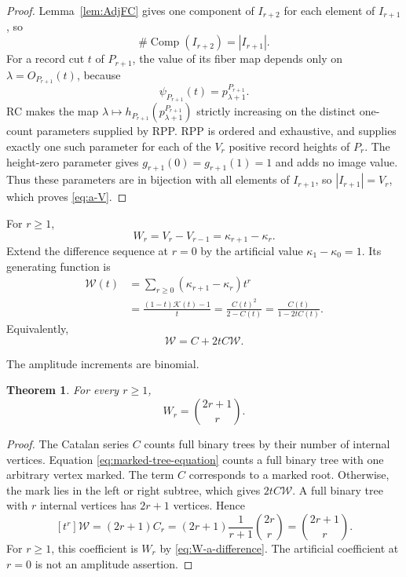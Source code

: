 \documentclass[11pt]{article}
\newtheorem{theorem}{Theorem}[section]
\theoremstyle{definition}
\theoremstyle{remark}
\DeclareMathOperator{\Comp}{Comp}
\begin{document}
\begin{proof}
Lemma~\ref{lem:AdjFC} gives one component of \(I_{r+2}\) for each element of
\(I_{r+1}\), so
\[
 \#\Comp(I_{r+2})=|I_{r+1}|.
\]
For a record cut \(t\) of \(P_{r+1}\), the value of its fiber map depends only
on \(\lambda=O_{P_{r+1}}(t)\), because
\[
 \psi_{P_{r+1}}(t)=p^{P_{r+1}}_{\lambda+1}.
\]
RC makes the map
\(\lambda\mapsto h_{P_{r+1}}(p^{P_{r+1}}_{\lambda+1})\) strictly increasing on the
distinct one-count parameters supplied by RPP.  RPP is ordered and
exhaustive, and supplies exactly one such parameter for each of the \(V_r\)
positive record heights of \(P_r\).  The height-zero parameter gives
\(g_{r+1}(0)=g_{r+1}(1)=1\) and adds no image value.  Thus these parameters
are in bijection with all elements of \(I_{r+1}\), so
\(|I_{r+1}|=V_r\), which proves
\eqref{eq:a-V}.
\end{proof}

For \(r\geq1\),
\begin{equation}
\label{eq:W-a-difference}
 W_r=V_r-V_{r-1}=\kappa_{r+1}-\kappa_r.
\end{equation}
Extend the difference sequence at \(r=0\) by the artificial value
\(\kappa_1-\kappa_0=1\).  Its generating function is
\begin{align*}
\mathscr W(t)
&=\sum_{r\geq0}(\kappa_{r+1}-\kappa_r)t^r\\
&=\frac{(1-t)\mathscr K(t)-1}{t}
 =\frac{C(t)^2}{2-C(t)}
 =\frac{C(t)}{1-2tC(t)}.
\end{align*}
Equivalently,
\begin{equation}
\label{eq:marked-tree-equation}
 \mathscr W=C+2tC\mathscr W.
\end{equation}

The amplitude increments are binomial.
\begin{theorem}
\label{thm:royal}
For every \(r\geq1\),
\begin{equation*}
 W_r=\binom{2r+1}{r}.
\end{equation*}
\end{theorem}

\begin{proof}
The Catalan series \(C\) counts full binary trees by their number of internal
vertices.  Equation \eqref{eq:marked-tree-equation} counts a full binary tree
with one arbitrary vertex marked.  The term \(C\) corresponds to a marked
root.  Otherwise, the mark lies in the left or right subtree, which gives
\(2tC\mathscr W\).  A full binary tree with \(r\) internal vertices has
\(2r+1\) vertices.  Hence
\[
 [t^r]\mathscr W
 =(2r+1)C_r
 =(2r+1)\frac1{r+1}\binom{2r}{r}
 =\binom{2r+1}{r}.
\]
For \(r\geq1\), this coefficient is \(W_r\) by
\eqref{eq:W-a-difference}.  The artificial coefficient at \(r=0\) is not an
amplitude assertion.
\end{proof}
\end{document}
